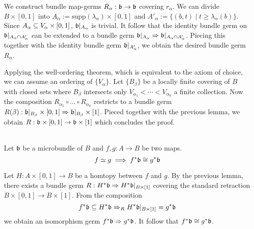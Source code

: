 \begin{file}
\begin{myproof}
We construct bundle map-germs $R_\alpha: \bb \to \bb$ covering $r_\alpha$.
We can divide $B \times [0, 1]$ into $A_\alpha := \text{supp}(\lambda_\alpha) \times [0, 1]$ and $A'_\alpha := \{(b, t) \mid t \ge \lambda_\alpha(b)\}$.
Since $A_\alpha \sub V_\alpha \times [0, 1]$, $\bb\restr{A_\alpha}$ is trivial.
It follow that the identity bundle germ on $\bb\restr{\A \cap \A[']}$ can be extended to a bundle germ $\bb\restr{\A} \double \bb\restr{\A \cap \A[']}$.
Piecing this together with the identity bundle germ $\bb\restr{\A[']}$, we obtain the desired bundle germ $R_\alpha$.

Applying the well-ordering theorem, which is equivalent to the axiom of choice, we can assume an ordering of $\{ V_\alpha \}$.
Let $\{B_\beta\}$ be a locally finite covering of $B$ with closed sets where $B_\beta$ intersects only $V_{\alpha_1} < \cdots < V_{\alpha_k}$ a finite collection.
Now the composition $R_{\alpha_1} \circ \ldots \circ R_{\alpha_k}$ restricts to a bundle germ $R(\beta): \bb\restr{B_\beta} \times [0, 1] \double \bb\restr{B_\beta} \times [1]$.
Pieced together with the previous lemma, we obtain $R: \bb \times [0, 1]\to \bb \times [1]$ which concludes the proof.
\end{myproof}

 \label{homotopy::theorem} \\
Let $\bb$ be a microbundle of $B$ and $f, g: A \to B$ be two maps.
\[ f \simeq g \implies f^*\bb \cong g^*\bb \]
\begin{myproof}
Let $H: A \times [0, 1] \to B$ be a homtopy between $f$ and $g$.
By the previous lemma, there exists a bundle germ $R: H^*\bb \double H^*\bb\restr{B \times [1]}$ covering the standard retraction $B \times [0, 1] \to B \times [1]$.
From the composition
\[ f^*\bb \sub H^*\bb \double_R H^*\bb\restr{B \times [1]} = g^*\bb \]
we obtain an isomorphism germ $f^*\bb \double g^*\bb$.
It follow that $f^*\bb \cong g^*\bb$.
\end{myproof}

\end{file}